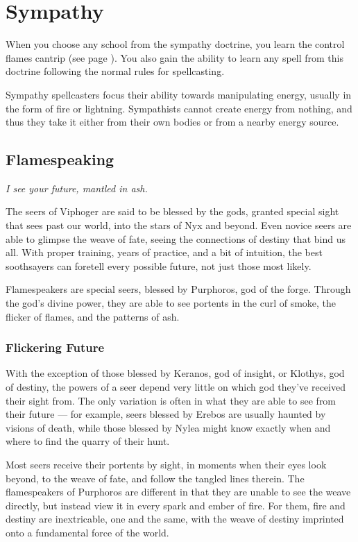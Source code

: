 \section{Sympathy} \label{sec::sympathy}
When you choose any school from the sympathy doctrine, you learn the control flames cantrip (see page \pageref{spell::controlflames}).
You also gain the ability to learn any spell from this doctrine following the normal rules for spellcasting.

Sympathy spellcasters focus their ability towards manipulating energy, usually in the form of fire or lightning.
Sympathists cannot create energy from nothing, and thus they take it either from their own bodies or from a nearby energy source.

\subsection*{Flamespeaking} \label{ssec::flamespeaking}
    \textit{I see your future, mantled in ash.}

    The seers of Viphoger are said to be blessed by the gods, granted special sight that sees past our world, into the stars of Nyx and beyond.
    Even novice seers are able to glimpse the weave of fate, seeing the connections of destiny that bind us all.
    With proper training, years of practice, and a bit of intuition, the best soothsayers can foretell every possible future, not just those most likely.

    Flamespeakers are special seers, blessed by Purphoros, god of the forge.
    Through the god's divine power, they are able to see portents in the curl of smoke, the flicker of flames, and the patterns of ash.

    \subsubsection{Flickering Future}
        With the exception of those blessed by Keranos, god of insight, or Klothys, god of destiny, the powers of a seer depend very little on which god they've received their sight from.
        The only variation is often in what they are able to see from their future --- for example, seers blessed by Erebos are usually haunted by visions of death, while those blessed by Nylea might know exactly when and where to find the quarry of their hunt.

        Most seers receive their portents by sight, in moments when their eyes look beyond, to the weave of fate, and follow the tangled lines therein.
        The flamespeakers of Purphoros are different in that they are unable to see the weave directly, but instead view it in every spark and ember of fire.
        For them, fire and destiny are inextricable, one and the same, with the weave of destiny imprinted onto a fundamental force of the world.

